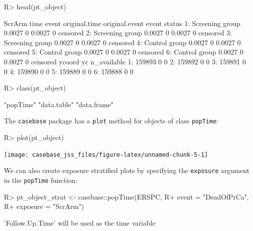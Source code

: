 \documentclass[article]{jss}
\begin{document}
\begin{CodeChunk}

\begin{CodeInput}
R> head(pt_object)
\end{CodeInput}

\begin{CodeOutput}
            ScrArm   time event original.time original.event event status
1: Screening group 0.0027     0        0.0027              0     censored
2: Screening group 0.0027     0        0.0027              0     censored
3: Screening group 0.0027     0        0.0027              0     censored
4:   Control group 0.0027     0        0.0027              0     censored
5:   Control group 0.0027     0        0.0027              0     censored
6:   Control group 0.0027     0        0.0027              0     censored
   ycoord yc n_available
1: 159893  0           0
2: 159892  0           0
3: 159891  0           0
4: 159890  0           0
5: 159889  0           0
6: 159888  0           0
\end{CodeOutput}

\begin{CodeInput}
R> class(pt_object)
\end{CodeInput}

\begin{CodeOutput}
[1] "popTime"    "data.table" "data.frame"
\end{CodeOutput}
\end{CodeChunk}

The \texttt{casebase} package has a \texttt{plot} method for objects of
class \texttt{popTime}:

\begin{CodeChunk}

\begin{CodeInput}
R> plot(pt_object)
\end{CodeInput}


\begin{center}\texttt{[image: casebase\_jss\_files/figure-latex/unnamed-chunk-5-1]} \end{center}

\end{CodeChunk}

We can also create exposure stratified plots by specifying the
\texttt{exposure} argument in the \texttt{popTime} function:

\begin{CodeChunk}

\begin{CodeInput}
R> pt_object_strat <- casebase::popTime(ERSPC, 
R+                                      event = "DeadOfPrCa", 
R+                                      exposure = "ScrArm")
\end{CodeInput}

\begin{CodeOutput}
'Follow.Up.Time' will be used as the time variable
\end{CodeOutput}
\end{CodeChunk}
\end{document}
